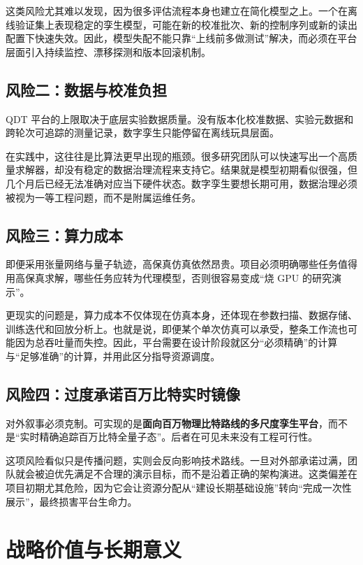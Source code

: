 \documentclass[11pt,a4paper]{article}
\newcommand{\QDT}{QDT}
\begin{document}
这类风险尤其难以发现，因为很多评估流程本身也建立在简化模型之上。一个在离线验证集上表现稳定的孪生模型，可能在新的校准批次、新的控制序列或新的读出配置下快速失效。因此，模型失配不能只靠“上线前多做测试”解决，而必须在平台层面引入持续监控、漂移探测和版本回滚机制。

\subsection{风险二：数据与校准负担}

\QDT{} 平台的上限取决于底层实验数据质量。没有版本化校准数据、实验元数据和跨轮次可追踪的测量记录，数字孪生只能停留在离线玩具层面。

在实践中，这往往是比算法更早出现的瓶颈。很多研究团队可以快速写出一个高质量求解器，却没有稳定的数据治理流程来支持它。结果就是模型初期看似很强，但几个月后已经无法准确对应当下硬件状态。数字孪生要想长期可用，数据治理必须被视为一等工程问题，而不是附属运维任务。

\subsection{风险三：算力成本}

即便采用张量网络与量子轨迹，高保真仿真依然昂贵。项目必须明确哪些任务值得用高保真求解，哪些任务应转为代理模型，否则很容易变成“烧 GPU 的研究演示”。

更现实的问题是，算力成本不仅体现在仿真本身，还体现在参数扫描、数据存储、训练迭代和回放分析上。也就是说，即便某个单次仿真可以承受，整条工作流也可能因为总吞吐量而失控。因此，平台需要在设计阶段就区分“必须精确”的计算与“足够准确”的计算，并用此区分指导资源调度。

\subsection{风险四：过度承诺百万比特实时镜像}

对外叙事必须克制。可实现的是\textbf{面向百万物理比特路线的多尺度孪生平台}，而不是“实时精确追踪百万比特全量子态”。后者在可见未来没有工程可行性。

这项风险看似只是传播问题，实则会反向影响技术路线。一旦对外部承诺过满，团队就会被迫优先满足不合理的演示目标，而不是沿着正确的架构演进。这类偏差在项目初期尤其危险，因为它会让资源分配从“建设长期基础设施”转向“完成一次性展示”，最终损害平台生命力。

\section{战略价值与长期意义}
\end{document}

